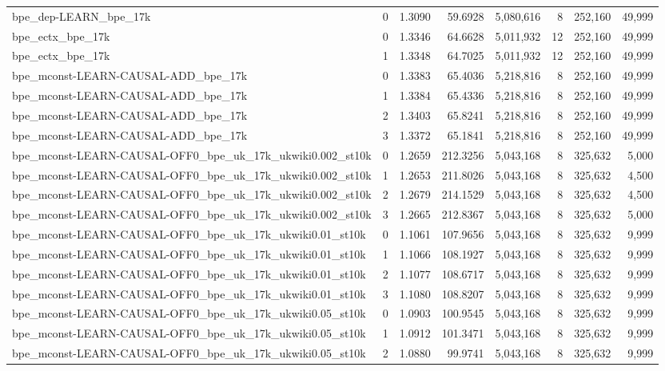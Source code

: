 \begin{tabular}{lrrrrrrr}
bpe\_dep-LEARN\_bpe\_17k & 0 & 1.3090 & 59.6928 & 5,080,616 & 8 & 252,160 & 49,999 \\
bpe\_ectx\_bpe\_17k & 0 & 1.3346 & 64.6628 & 5,011,932 & 12 & 252,160 & 49,999 \\
bpe\_ectx\_bpe\_17k & 1 & 1.3348 & 64.7025 & 5,011,932 & 12 & 252,160 & 49,999 \\
bpe\_mconst-LEARN-CAUSAL-ADD\_bpe\_17k & 0 & 1.3383 & 65.4036 & 5,218,816 & 8 & 252,160 & 49,999 \\
bpe\_mconst-LEARN-CAUSAL-ADD\_bpe\_17k & 1 & 1.3384 & 65.4336 & 5,218,816 & 8 & 252,160 & 49,999 \\
bpe\_mconst-LEARN-CAUSAL-ADD\_bpe\_17k & 2 & 1.3403 & 65.8241 & 5,218,816 & 8 & 252,160 & 49,999 \\
bpe\_mconst-LEARN-CAUSAL-ADD\_bpe\_17k & 3 & 1.3372 & 65.1841 & 5,218,816 & 8 & 252,160 & 49,999 \\
bpe\_mconst-LEARN-CAUSAL-OFF0\_bpe\_uk\_17k\_ukwiki0.002\_st10k & 0 & 1.2659 & 212.3256 & 5,043,168 & 8 & 325,632 & 5,000 \\
bpe\_mconst-LEARN-CAUSAL-OFF0\_bpe\_uk\_17k\_ukwiki0.002\_st10k & 1 & 1.2653 & 211.8026 & 5,043,168 & 8 & 325,632 & 4,500 \\
bpe\_mconst-LEARN-CAUSAL-OFF0\_bpe\_uk\_17k\_ukwiki0.002\_st10k & 2 & 1.2679 & 214.1529 & 5,043,168 & 8 & 325,632 & 4,500 \\
bpe\_mconst-LEARN-CAUSAL-OFF0\_bpe\_uk\_17k\_ukwiki0.002\_st10k & 3 & 1.2665 & 212.8367 & 5,043,168 & 8 & 325,632 & 5,000 \\
bpe\_mconst-LEARN-CAUSAL-OFF0\_bpe\_uk\_17k\_ukwiki0.01\_st10k & 0 & 1.1061 & 107.9656 & 5,043,168 & 8 & 325,632 & 9,999 \\
bpe\_mconst-LEARN-CAUSAL-OFF0\_bpe\_uk\_17k\_ukwiki0.01\_st10k & 1 & 1.1066 & 108.1927 & 5,043,168 & 8 & 325,632 & 9,999 \\
bpe\_mconst-LEARN-CAUSAL-OFF0\_bpe\_uk\_17k\_ukwiki0.01\_st10k & 2 & 1.1077 & 108.6717 & 5,043,168 & 8 & 325,632 & 9,999 \\
bpe\_mconst-LEARN-CAUSAL-OFF0\_bpe\_uk\_17k\_ukwiki0.01\_st10k & 3 & 1.1080 & 108.8207 & 5,043,168 & 8 & 325,632 & 9,999 \\
bpe\_mconst-LEARN-CAUSAL-OFF0\_bpe\_uk\_17k\_ukwiki0.05\_st10k & 0 & 1.0903 & 100.9545 & 5,043,168 & 8 & 325,632 & 9,999 \\
bpe\_mconst-LEARN-CAUSAL-OFF0\_bpe\_uk\_17k\_ukwiki0.05\_st10k & 1 & 1.0912 & 101.3471 & 5,043,168 & 8 & 325,632 & 9,999 \\
bpe\_mconst-LEARN-CAUSAL-OFF0\_bpe\_uk\_17k\_ukwiki0.05\_st10k & 2 & 1.0880 & 99.9741 & 5,043,168 & 8 & 325,632 & 9,999 \\

\end{tabular}
